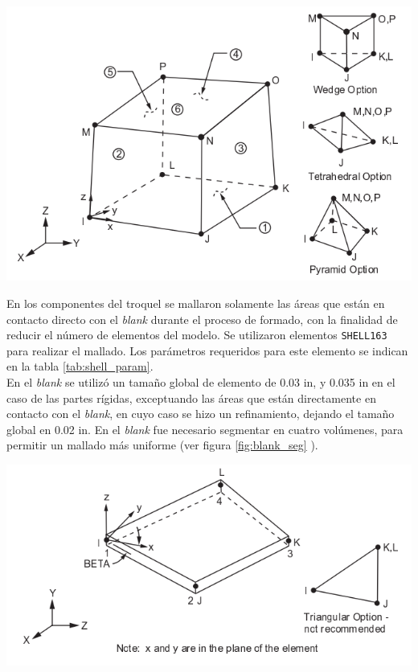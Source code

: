\begin{center}
\includegraphics[scale=0.55]{src/ch3/solid164.png}
\label{fig:solid164}
\end{center}

En los componentes del troquel se mallaron solamente las áreas que están en contacto directo con el 
\textit{blank} durante el proceso de formado, con la finalidad de reducir el número de elementos del modelo. 
Se utilizaron elementos \texttt{SHELL163} para realizar el mallado. Los parámetros requeridos para 
este elemento se indican en la tabla \ref{tab:shell_param}. \\

En el \textit{blank} se utilizó un tamaño global de elemento de 0.03 in, y 0.035 in en el caso de las partes 
rígidas, exceptuando las áreas que están directamente en contacto con el \textit{blank}, en cuyo caso se hizo 
un refinamiento, dejando el tamaño global en 0.02 in. En el \textit{blank} fue necesario segmentar en cuatro 
volúmenes, para permitir un mallado más uniforme (ver figura \ref{fig:blank_seg} ).

\begin{center}
\includegraphics[scale=0.55]{src/ch3/shell163.png}
\label{fig:shell163}
\end{center}

